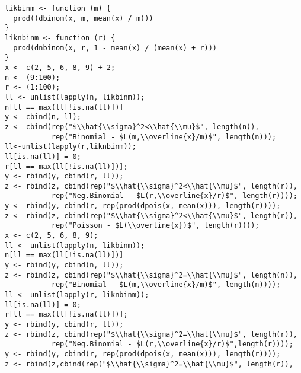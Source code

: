 \documentclass[]{book}
\theoremstyle{definition}
\theoremstyle{definition}
\theoremstyle{definition}
\theoremstyle{remark}
\begin{document}
\hypertarget{toggleCodeFreq.2}{}
\begin{verbatim}
likbinm <- function (m) {
  prod((dbinom(x, m, mean(x) / m)))
}
liknbinm <- function (r) {
  prod(dnbinom(x, r, 1 - mean(x) / (mean(x) + r)))
}
x <- c(2, 5, 6, 8, 9) + 2;
n <- (9:100);
r <- (1:100);
ll <- unlist(lapply(n, likbinm));
n[ll == max(ll[!is.na(ll)])]
y <- cbind(n, ll);
z <- cbind(rep("$\\hat{\\sigma}^2<\\hat{\\mu}$", length(n)), 
           rep("Binomial - $L(m,\\overline{x}/m)$", length(n)));
ll<-unlist(lapply(r,liknbinm));
ll[is.na(ll)] = 0;
r[ll == max(ll[!is.na(ll)])];
y <- rbind(y, cbind(r, ll));
z <- rbind(z, cbind(rep("$\\hat{\\sigma}^2<\\hat{\\mu}$", length(r)), 
           rep("Neg.Binomial - $L(r,\\overline{x}/r)$", length(r))));
y <- rbind(y, cbind(r, rep(prod(dpois(x, mean(x))), length(r))));
z <- rbind(z, cbind(rep("$\\hat{\\sigma}^2<\\hat{\\mu}$", length(r)), 
           rep("Poisson - $L(\\overline{x})$", length(r))));
x <- c(2, 5, 6, 8, 9);
ll <- unlist(lapply(n, likbinm));
n[ll == max(ll[!is.na(ll)])]
y <- rbind(y, cbind(n, ll));
z <- rbind(z, cbind(rep("$\\hat{\\sigma}^2=\\hat{\\mu}$", length(n)), 
           rep("Binomial - $L(m,\\overline{x}/m)$", length(n))));
ll <- unlist(lapply(r, liknbinm));
ll[is.na(ll)] = 0;
r[ll == max(ll[!is.na(ll)])];
y <- rbind(y, cbind(r, ll));
z <- rbind(z, cbind(rep("$\\hat{\\sigma}^2=\\hat{\\mu}$", length(r)), 
           rep("Neg.Binomial - $L(r,\\overline{x}/r)$",length(r))));
y <- rbind(y, cbind(r, rep(prod(dpois(x, mean(x))), length(r))));
z <- rbind(z,cbind(rep("$\\hat{\\sigma}^2=\\hat{\\mu}$", length(r)), 

\end{verbatim}
\end{document}
